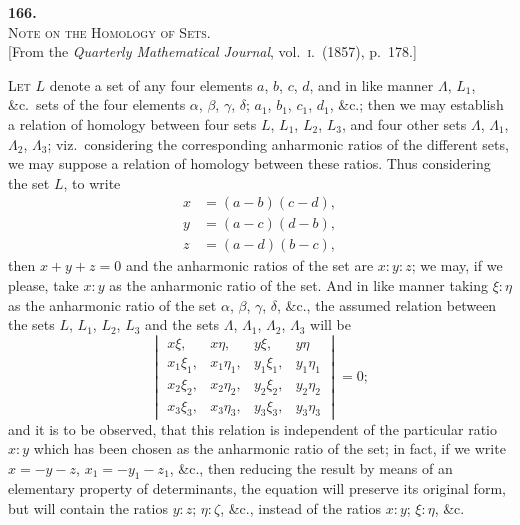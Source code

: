 \documentclass[11pt]{article}
\begin{document}
\bigskip

\begin{center}
{\large\textbf{166.}}\\[1em]
{\large\scshape Note on the Homology of Sets.}\\[1em]
{\small [From the \textit{Quarterly Mathematical Journal}, vol.~\textsc{i}.\ (1857), p.~178.]}
\end{center}

\bigskip

\textsc{Let} $L$ denote a set of any four elements $a$, $b$, $c$, $d$, and in like manner $\Lambda$, $L_{1}$, \&c.\
sets of the four elements $\alpha$, $\beta$, $\gamma$, $\delta$; $a_{1}$, $b_{1}$, $c_{1}$, $d_{1}$, \&c.; then we may establish a
relation of homology between four sets $L$, $L_{1}$, $L_{2}$, $L_{3}$, and four other sets $\Lambda$, $\Lambda_{1}$, $\Lambda_{2}$, $\Lambda_{3}$;
viz.\ considering the corresponding anharmonic ratios of the different sets, we may
suppose a relation of homology between these ratios. Thus considering the set $L$, to
write
\begin{align*}
x &= (a - b)(c - d),\\
y &= (a - c)(d - b),\\
z &= (a - d)(b - c),
\end{align*}
then $x + y + z = 0$ and the anharmonic ratios of the set are $x : y : z$; we may, if
we please, take $x : y$ as the anharmonic ratio of the set. And in like manner taking
$\xi : \eta$ as the anharmonic ratio of the set $\alpha$, $\beta$, $\gamma$, $\delta$, \&c., the assumed relation between
the sets $L$, $L_{1}$, $L_{2}$, $L_{3}$ and the sets $\Lambda$, $\Lambda_{1}$, $\Lambda_{2}$, $\Lambda_{3}$ will be
\[
\begin{vmatrix}
x\xi, & x\eta, & y\xi, & y\eta\\
x_{1}\xi_{1}, & x_{1}\eta_{1}, & y_{1}\xi_{1}, & y_{1}\eta_{1}\\
x_{2}\xi_{2}, & x_{2}\eta_{2}, & y_{2}\xi_{2}, & y_{2}\eta_{2}\\
x_{3}\xi_{3}, & x_{3}\eta_{3}, & y_{3}\xi_{3}, & y_{3}\eta_{3}
\end{vmatrix} = 0;
\]
and it is to be observed, that this relation is independent of the particular ratio
$x : y$ which has been chosen as the anharmonic ratio of the set; in fact, if we write
$x = -y - z$, $x_{1} = -y_{1} - z_{1}$, \&c., then reducing the result by means of an elementary
property of determinants, the equation will preserve its original form, but will contain
the ratios $y : z$; $\eta : \zeta$, \&c., instead of the ratios $x : y$; $\xi : \eta$, \&c.
\end{document}
